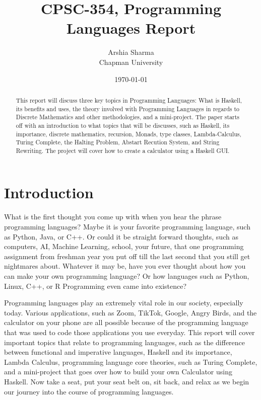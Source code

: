 \documentclass{article}
\title{CPSC-354, Programming Languages Report}
\author{Arshia Sharma \\ Chapman University}
\date{\today}
\begin{document}
\maketitle

\begin{abstract}
\noindent
This report will discuss three key topics in Programming Languages: What is Haskell, its benefits and uses, the theory involved with Programming Languages in regards to Discrete Mathematics and other methodologies, and a mini-project. The paper starts off with an introduction to what topics that will be discusses, such as Haskell, its importance, discrete mathematics, recursion, Monads, type classes, Lambda-Calculus, Turing Complete, the Halting Problem, Abstart Recution System, and String Rewriting. The project will cover how to create a calculator using a Haskell GUI. 

\end{abstract}

\tableofcontents

\section{Introduction}\label{intro}

What is the first thought you come up with when you hear the phrase programming languages? Maybe it is your favorite programming language, such as Python, Java, or C++. Or could it be straight forward thoughts, such as computers, AI, Machine Learning, school, your future, that one programming assignment from freshman year you put off till the last second that you still get nightmares about. Whatever it may be, have you ever thought about how you can make your own programming language? Or how languages such as Python, Linux, C++, or R Programming even came into existence? 

\medskip\noindent
Programming languages play an extremely vital role in our society, especially today. Various applications, such as Zoom, TikTok, Google, Angry Birds, and the calculator on your phone are all possible because of the programming language that was used to code those applications you use everyday. This report will cover important topics that relate to programming languages, such as the difference between functional and imperative languages, Haskell and its importance, Lambda Calculus, programming language core theories, such as Turing Complete, and a mini-project that goes over how to build your own Calculator using Haskell. Now take a seat, put your seat belt on, sit back, and relax as we begin our journey into the course of programming languages.
\end{document}
